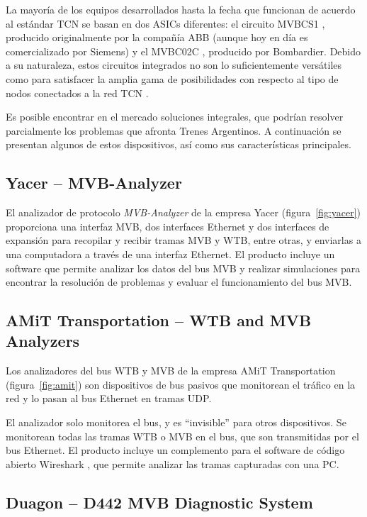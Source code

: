 La mayoría de los equipos desarrollados hasta la fecha que funcionan de acuerdo al estándar TCN se basan en dos ASICs diferentes: el circuito MVBCS1 \cite{mvbcs1}, producido originalmente por la compañía ABB (aunque hoy en día es comercializado por Siemens) y el MVBC02C \cite{mvbc02c}, producido por Bombardier. Debido a su naturaleza, estos circuitos integrados no son lo suficientemente versátiles como para satisfacer la amplia gama de posibilidades con respecto al tipo de nodos conectados a la red TCN \cite{mvb-pub-3}.

Es posible encontrar en el mercado soluciones integrales, que podrían resolver parcialmente los problemas que afronta Trenes Argentinos. A continuación se presentan algunos de estos dispositivos, así como sus características principales.

\subsection{Yacer -- MVB-Analyzer}

El analizador de protocolo \textit{MVB-Analyzer} de la empresa Yacer \cite{yacer} (figura~\ref{fig:yacer}) proporciona una interfaz MVB, dos interfaces Ethernet y dos interfaces de expansión para recopilar y recibir tramas MVB y WTB, entre otras, y enviarlas a una computadora a través de una interfaz Ethernet. El producto incluye un software que permite analizar los datos del bus MVB y realizar simulaciones para encontrar la resolución de problemas y evaluar el funcionamiento del bus MVB.

\subsection{AMiT Transportation -- WTB and MVB Analyzers}

Los analizadores del bus WTB y MVB de la empresa AMiT Transportation \cite{amit} (figura~\ref{fig:amit}) son dispositivos de bus pasivos que monitorean el tráfico en la red y lo pasan al bus Ethernet en tramas UDP.

El analizador solo monitorea el bus, y es ``invisible'' para otros dispositivos. Se monitorean todas las tramas WTB o MVB en el bus, que son transmitidas por el bus Ethernet. El producto incluye un complemento para el software de código abierto Wireshark \cite{wireshark}, que permite analizar las tramas capturadas con una PC.

\subsection{Duagon -- D442 MVB Diagnostic System}

